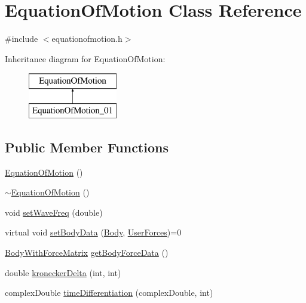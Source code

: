 \hypertarget{class_equation_of_motion}{\section{Equation\-Of\-Motion Class Reference}
\label{class_equation_of_motion}
}


{\ttfamily \#include $<$equationofmotion.\-h$>$}

Inheritance diagram for Equation\-Of\-Motion\-:\begin{figure}[H]
\begin{center}
\leavevmode
\includegraphics[height=2.000000cm]{class_equation_of_motion}
\end{center}
\end{figure}
\subsection*{Public Member Functions}
\begin{DoxyCompactItemize}
\item 
\hyperlink{class_equation_of_motion_abdb595c57202820b3c78518cb5d459e4}{Equation\-Of\-Motion} ()
\item 
\hyperlink{class_equation_of_motion_ac62caa9b6cdc62ff36d725637e53e62f}{$\sim$\-Equation\-Of\-Motion} ()
\item 
void \hyperlink{class_equation_of_motion_a2c1b3517a0f2aaef687c99fb6b4803dc}{set\-Wave\-Freq} (double)
\item 
virtual void \hyperlink{class_equation_of_motion_a340c67ae539fb20634e7b5bb8edf65f0}{set\-Body\-Data} (\hyperlink{class_body}{Body}, \hyperlink{class_user_forces}{User\-Forces})=0
\item 
\hyperlink{class_body_with_force_matrix}{Body\-With\-Force\-Matrix} \hyperlink{class_equation_of_motion_a7481a809cff3f63523885e1ac372fcc3}{get\-Body\-Force\-Data} ()
\item 
double \hyperlink{class_equation_of_motion_a2b16c339fe40262a4ef1f7b8b0036a01}{kronecker\-Delta} (int, int)
\item 
complex\-Double \hyperlink{class_equation_of_motion_a52e671f290c5a07d1187d56849c84060}{time\-Differentiation} (complex\-Double, int)
\end{DoxyCompactItemize}
